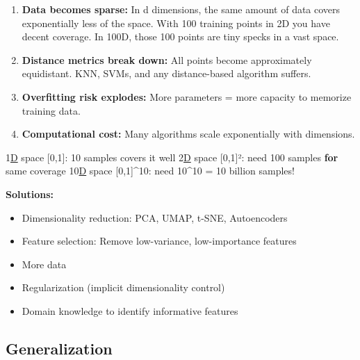 \documentclass[11pt]{article}
\providecommand{\tightlist}{\setlength{\itemsep}{1pt}\setlength{\parskip}{0pt}}
\newenvironment{Shaded}{\begin{snugshade}}{\end{snugshade}}
\newcommand{\ControlFlowTok}[1]{\textcolor[rgb]{0.99,0.74,0.29}{\textbf{#1}}}
\newcommand{\DecValTok}[1]{\textcolor[rgb]{0.96,0.45,0.00}{#1}}
\newcommand{\ErrorTok}[1]{\textcolor[rgb]{0.85,0.27,0.33}{\underline{#1}}}
\newcommand{\NormalTok}[1]{\textcolor[rgb]{0.81,0.81,0.76}{#1}}
\newcommand{\OperatorTok}[1]{\textcolor[rgb]{0.81,0.81,0.76}{#1}}
\begin{document}
\begin{enumerate}
\def\labelenumi{\arabic{enumi}.}
\item
  \textbf{Data becomes sparse:} In d dimensions, the same amount of data covers exponentially less of the space. With 100 training points in 2D you have decent coverage. In 100D, those 100 points are tiny specks in a vast space.
\item
  \textbf{Distance metrics break down:} All points become approximately equidistant. KNN, SVMs, and any distance-based algorithm suffers.
\item
  \textbf{Overfitting risk explodes:} More parameters = more capacity to memorize training data.
\item
  \textbf{Computational cost:} Many algorithms scale exponentially with dimensions.
\end{enumerate}


\begin{Shaded}
\begin{Highlighting}[]
\DecValTok{1}\ErrorTok{D}\NormalTok{ space [}\DecValTok{0}\NormalTok{,}\DecValTok{1}\NormalTok{]: }\DecValTok{10}\NormalTok{ samples covers it well}
\DecValTok{2}\ErrorTok{D}\NormalTok{ space [}\DecValTok{0}\NormalTok{,}\DecValTok{1}\NormalTok{]²: need }\DecValTok{100}\NormalTok{ samples }\ControlFlowTok{for}\NormalTok{ same coverage}
\DecValTok{10}\ErrorTok{D}\NormalTok{ space [}\DecValTok{0}\NormalTok{,}\DecValTok{1}\NormalTok{]}\OperatorTok{\^{}}\DecValTok{10}\NormalTok{: need }\DecValTok{10}\OperatorTok{\^{}}\DecValTok{10} \OperatorTok{=} \DecValTok{10}\NormalTok{ billion samples}\OperatorTok{!}
\end{Highlighting}
\end{Shaded}

\textbf{Solutions:}

\begin{itemize}
\tightlist
\item
  Dimensionality reduction: PCA, UMAP, t-SNE, Autoencoders
\item
  Feature selection: Remove low-variance, low-importance features
\item
  More data
\item
  Regularization (implicit dimensionality control)
\item
  Domain knowledge to identify informative features
\end{itemize}

\subsection{Generalization}\label{generalization}
\end{document}
